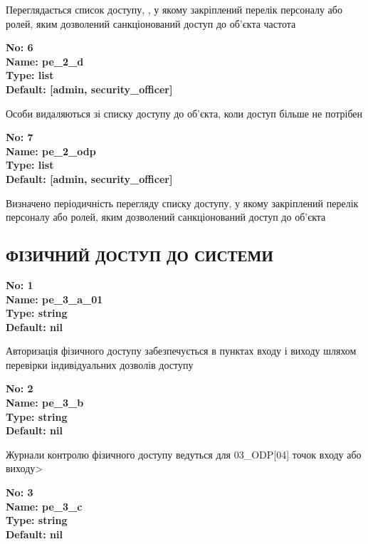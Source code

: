 \documentclass{article}
\begin{document}
{\footnotesize Переглядається список доступу, , у якому закріплений перелік персоналу або ролей, яким дозволений санкціонований доступ до об'єкта частота}


{\footnotesize\bfseries
No: 6\\
Name: pe\_\allowbreak{}2\_\allowbreak{}d\\
Type: list\\
Default: [\textquotedbl{}admin\textquotedbl{}, \textquotedbl{}security\_\allowbreak{}officer\textquotedbl{}]
}

{\footnotesize Особи видаляються зі списку доступу до об'єкта, коли доступ більше не потрібен}


{\footnotesize\bfseries
No: 7\\
Name: pe\_\allowbreak{}2\_\allowbreak{}odp\\
Type: list\\
Default: [\textquotedbl{}admin\textquotedbl{}, \textquotedbl{}security\_\allowbreak{}officer\textquotedbl{}]
}

{\footnotesize Визначено періодичність перегляду списку доступу, у якому закріплений перелік персоналу або ролей, яким дозволений санкціонований доступ до об'єкта}




\subsection{ФІЗИЧНИЙ ДОСТУП ДО СИСТЕМИ}


\vspace{10pt}
{\footnotesize\bfseries
No: 1\\
Name: pe\_\allowbreak{}3\_\allowbreak{}a\_\allowbreak{}01\\
Type: string\\
Default: nil
}

{\footnotesize Авторизація фізичного доступу забезпечується в пунктах входу і виходу шляхом перевірки індивідуальних дозволів доступу}


{\footnotesize\bfseries
No: 2\\
Name: pe\_\allowbreak{}3\_\allowbreak{}b\\
Type: string\\
Default: nil
}

{\footnotesize Журнали контролю фізичного доступу ведуться для 03\_\allowbreak{}ODP[04] точок входу або виходу>}


{\footnotesize\bfseries
No: 3\\
Name: pe\_\allowbreak{}3\_\allowbreak{}c\\
Type: string\\
Default: nil
}
\end{document}
